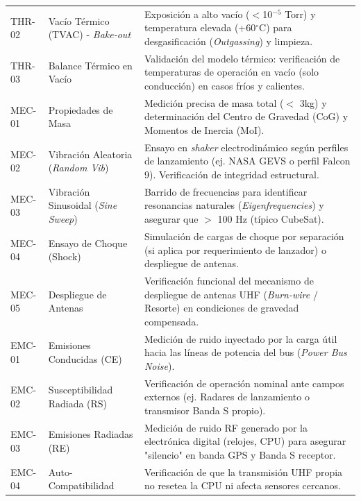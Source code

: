 \begin{footnotesize}
\begin{longtable}{|@{\hspace{4pt}}l >{\raggedright\arraybackslash}p{4.0cm} >{\raggedright\arraybackslash}p{8.6cm}@{\hspace{4pt}}|}
THR-02 & Vacío Térmico (TVAC) - \textit{Bake-out} & Exposición a alto vacío ($<$10$^{-5}$ Torr) y temperatura elevada (+60$^{\circ}$C) para desgasificación (\textit{Outgassing}) y limpieza. \\
THR-03 & Balance Térmico en Vacío & Validación del modelo térmico: verificación de temperaturas de operación en vacío (solo conducción) en casos fríos y calientes. \\
MEC-01 & Propiedades de Masa & Medición precisa de masa total ($<$ 3kg) y determinación del Centro de Gravedad (CoG) y Momentos de Inercia (MoI). \\
MEC-02 & Vibración Aleatoria (\textit{Random Vib}) & Ensayo en \textit{shaker} electrodinámico según perfiles de lanzamiento (ej. NASA GEVS o perfil Falcon 9). Verificación de integridad estructural. \\
MEC-03 & Vibración Sinusoidal (\textit{Sine Sweep}) & Barrido de frecuencias para identificar resonancias naturales (\textit{Eigenfrequencies}) y asegurar que $>$ 100 Hz (típico CubeSat). \\
MEC-04 & Ensayo de Choque (Shock) & Simulación de cargas de choque por separación (si aplica por requerimiento de lanzador) o despliegue de antenas. \\
MEC-05 & Despliegue de Antenas & Verificación funcional del mecanismo de despliegue de antenas UHF (\textit{Burn-wire} / Resorte) en condiciones de gravedad compensada. \\
EMC-01 & Emisiones Conducidas (CE) & Medición de ruido inyectado por la carga útil hacia las líneas de potencia del bus (\textit{Power Bus Noise}). \\
EMC-02 & Susceptibilidad Radiada (RS) & Verificación de operación nominal ante campos externos (ej. Radares de lanzamiento o transmisor Banda S propio). \\
EMC-03 & Emisiones Radiadas (RE) & Medición de ruido RF generado por la electrónica digital (relojes, CPU) para asegurar "silencio" en banda GPS y Banda S receptor. \\
EMC-04 & Auto-Compatibilidad & Verificación de que la transmisión UHF propia no resetea la CPU ni afecta sensores cercanos. \\
\end{longtable}
\end{footnotesize}
